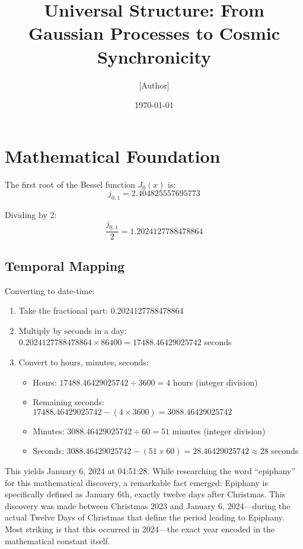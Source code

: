 \documentclass{article}
\title{Universal Structure: From Gaussian Processes to Cosmic Synchronicity}
\author{[Author]}
\date{\today}
\begin{document}
\maketitle

\section{Mathematical Foundation}
The first root of the Bessel function $J_0(x)$ is:
\[ j_{0,1} = 2.404825557695773 \]

Dividing by 2:
\[ \frac{j_{0,1}}{2} = 1.2024127788478864 \]

\subsection{Temporal Mapping}
Converting to date-time:
\begin{enumerate}
\item Take the fractional part: 0.2024127788478864
\item Multiply by seconds in a day: $0.2024127788478864 \times 86400 = 17488.46429025742$ seconds
\item Convert to hours, minutes, seconds:
    \begin{itemize}
    \item Hours: $17488.46429025742 \div 3600 = 4$ hours (integer division)
    \item Remaining seconds: $17488.46429025742 - (4 \times 3600) = 3088.46429025742$
    \item Minutes: $3088.46429025742 \div 60 = 51$ minutes (integer division)
    \item Seconds: $3088.46429025742 - (51 \times 60) = 28.46429025742 \approx 28$ seconds
    \end{itemize}
\end{enumerate}

This yields January 6, 2024 at 04:51:28. While researching the word ``epiphany'' for this mathematical discovery, a remarkable fact emerged: Epiphany is specifically defined as January 6th, exactly twelve days after Christmas. This discovery was made between Christmas 2023 and January 6, 2024---during the actual Twelve Days of Christmas that define the period leading to Epiphany. Most striking is that this occurred in 2024---the exact year encoded in the mathematical constant itself.
\end{document}
